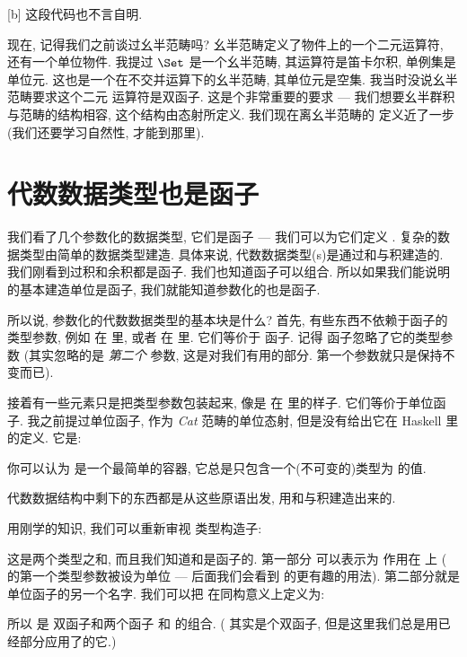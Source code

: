 [b]
这段代码也不言自明.

现在, 记得我们之前谈过幺半范畴吗? 幺半范畴定义了物件上的一个二元运算符, 还有一个单位物件. 我提过 $\Set$ 是一个幺半范畴,
其运算符是笛卡尔积, 单例集是单位元. 这也是一个在不交并运算下的幺半范畴, 其单位元是空集. 我当时没说幺半范畴要求这个二元
运算符是双函子. 这是个非常重要的要求 --- 我们想要幺半群积与范畴的结构相容, 这个结构由态射所定义. 我们现在离幺半范畴的
定义近了一步(我们还要学习自然性, 才能到那里).

\section{代数数据类型也是函子}

我们看了几个参数化的数据类型, 它们是函子 --- 我们可以为它们定义 . 复杂的数据类型由简单的数据类型建造.
具体来说, 代数数据类型(s)是通过和与积建造的. 我们刚看到过积和余积都是函子. 我们也知道函子可以组合.
所以如果我们能说明的基本建造单位是函子, 我们就能知道参数化的也是函子.

所以说, 参数化的代数数据类型的基本块是什么? 首先, 有些东西不依赖于函子的类型参数, 例如  在 
里, 或者  在  里. 它们等价于  函子. 记得  函子忽略了它的类型参数
(其实忽略的是 \emph{第二个} 参数, 这是对我们有用的部分. 第一个参数就只是保持不变而已).

接着有一些元素只是把类型参数包装起来, 像是  在  里的样子. 它们等价于单位函子. 我之前提过单位函子,
作为 \emph{Cat} 范畴的单位态射, 但是没有给出它在 Haskell 里的定义. 它是:


你可以认为  是一个最简单的容器, 它总是只包含一个(不可变的)类型为  的值.

代数数据结构中剩下的东西都是从这些原语出发, 用和与积建造出来的.

用刚学的知识, 我们可以重新审视  类型构造子:

这是两个类型之和, 而且我们知道和是函子的. 第一部分  可以表示为  作用在  上
( 的第一个类型参数被设为单位 --- 后面我们会看到  的更有趣的用法). 第二部分就是单位函子的另一个名字.
我们可以把  在同构意义上定义为:

所以  是  双函子和两个函子  和  的组合.
( 其实是个双函子, 但是这里我们总是用已经部分应用了的它.)

